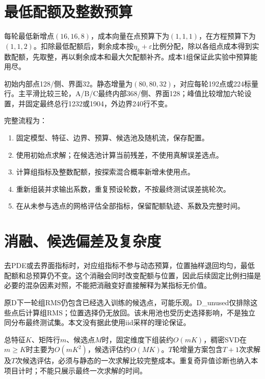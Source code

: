 \section{最低配额及整数预算}
每轮最低新增点$(16,16,8)$，成本向量在点预算下为$(1,1,1)$，在方程预算下为$(1,1,2)$。扣除最低配额后，剩余成本按$\eta_k+\varepsilon$比例分配，除以各组点成本得到实数配额，先取整，再以剩余成本和最大欠配额补齐。成本1组保证此实验中预算能用尽。

初始内部点128/侧、界面32。静态增量为$(80,80,32)$，对应每轮192点或224标量行。主平滑比较三轮，A/B/C最终内部368/侧、界面128；峰值比较增加六轮设置，并固定最终总行1232或1904，外边界240行不变。

完整流程为：\begin{enumerate}
\item 固定模型、特征、边界、预算、候选池及随机流，保存配置。
\item 使用初始点求解；在候选池计算当前残差，不使用真解误差选点。
\item 计算组指标及整数配额，按探索混合概率新增未使用点。
\item 重新组装并求输出系数，重复预设轮数，不按最终测试误差挑轮次。
\item 在从未参与选点的网格评估全部指标，保留配额轨迹、系数及完整时间。
\end{enumerate}

\section{消融、候选偏差及复杂度}
去PDE或去界面指标时，对应组指标不参与动态预算，位置抽样退回均匀，最低配额和总预算仍不变。这个消融会同时改变配额与位置，因此后续固定比例扫描是必要的混杂因素对照，不能把消融变好直接解释为某指标无价值。

原D下一轮组RMS仍包含已经选入训练的候选点，可能乐观。D\_unused仅排除这些点后计算组RMS；位置选择仍无放回。该未用池也受历史选择影响，不是独立同分布最终测试集。本文没有据此使用iid采样的理论保证。

总特征$K$、矩阵行$m$、候选点$M$时，固定维度下组装约$O(mK)$，稠密SVD在$m\ge K$时主要为$O(mK^2)$，候选评估约$O(MK)$。$T$轮增量方案包含$T+1$次求解及$T$次候选评估，必须与静态的一次求解比较完整成本。重复奇异值诊断也纳入本项目计时；不能只展示最终一次求解的时间。
